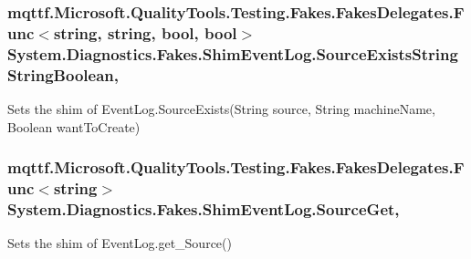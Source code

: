 \hypertarget{class_system_1_1_diagnostics_1_1_fakes_1_1_shim_event_log_a4501ba6203bdd0cc83164d901120722d}{
\subsubsection[{Source\-Exists\-String\-String\-Boolean}]{\setlength{\rightskip}{0pt plus 5cm}mqttf.\-Microsoft.\-Quality\-Tools.\-Testing.\-Fakes.\-Fakes\-Delegates.\-Func$<$string, string, bool, bool$>$ System.\-Diagnostics.\-Fakes.\-Shim\-Event\-Log.\-Source\-Exists\-String\-String\-Boolean\hspace{0.3cm}{\ttfamily [static]}, {\ttfamily [set]}}}\label{class_system_1_1_diagnostics_1_1_fakes_1_1_shim_event_log_a4501ba6203bdd0cc83164d901120722d}


Sets the shim of Event\-Log.\-Source\-Exists(\-String source, String machine\-Name, Boolean want\-To\-Create)

\hypertarget{class_system_1_1_diagnostics_1_1_fakes_1_1_shim_event_log_a110bbb96a35a64c3be628de89387d463}{
\subsubsection[{Source\-Get}]{\setlength{\rightskip}{0pt plus 5cm}mqttf.\-Microsoft.\-Quality\-Tools.\-Testing.\-Fakes.\-Fakes\-Delegates.\-Func$<$string$>$ System.\-Diagnostics.\-Fakes.\-Shim\-Event\-Log.\-Source\-Get\hspace{0.3cm}{\ttfamily [get]}, {\ttfamily [set]}}}\label{class_system_1_1_diagnostics_1_1_fakes_1_1_shim_event_log_a110bbb96a35a64c3be628de89387d463}


Sets the shim of Event\-Log.\-get\-\_\-\-Source()

